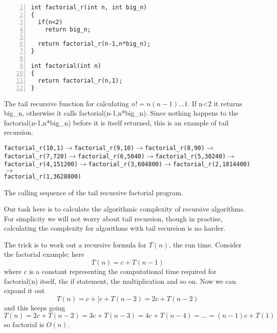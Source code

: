 \documentclass[11pt,a4paper]{scrartcl}
\begin{document}
\begin{table}
\begin{lstlisting}[numbers=left]
int factorial_r(int n, int big_n)
{
  if(n<2)
    return big_n;

  return factorial_r(n-1,n*big_n);
}

int factorial(int n)
{
  return factorial_r(n,1);
}
\end{lstlisting}
\caption{The tail recursive function for calculating $n!=n(n-1)\ldots
  1$. If n<2 it returns big\_n, otherwise it calls
  factorial(n-1,n*big\_n). Since nothing happens to the
  factorial(n-1,n*big\_n) before it is itself returned, this is an
  example of tail recursion.\label{c_factorial_tail}}
\end{table}

\begin{table}
\texttt{factorial\_r(10,1)}$\rightarrow$\texttt{factorial\_r(9,10)}$\rightarrow$\texttt{factorial\_r(8,90)}$\rightarrow$\\
\texttt{factorial\_r(7,720)}$\rightarrow$\texttt{factorial\_r(6,5040)}$\rightarrow$\texttt{factorial\_r(5,30240)}$\rightarrow$\\
\texttt{factorial\_r(4,151200)}$\rightarrow$\texttt{factorial\_r(3,604800)}$\rightarrow$\texttt{factorial\_r(2,1814400)}$\rightarrow$\\
\texttt{factorial\_r(1,3628800)}
\caption{The calling sequence of the tail recursive factorial program.\label{calling}}
\end{table}

Our task here is to calculate the algorithmic complexity of recursive
algorithms. For simplicity we will not worry about tail recursion,
though in practise, calculating the complexity for algorithms with
tail recursion is no harder.

The trick is to work out a recursive formula for $T(n)$, the run
time. Consider the factorial example; here
\begin{equation}
T(n)=c+T(n-1)
\end{equation}
where $c$ is a constant representing the computational time required
for factorial(n) itself, the if statement, the multiplication and so
on. Now we can expand it out
\begin{equation}
T(n)=c+[c+T(n-2)=2c+T(n-2)
\end{equation}
and this keeps going
\begin{equation}
T(n)=2c+T(n-2)=3c+T(n-3)=4c+T(n-4)=\ldots = (n-1)c+T(1)
\end{equation}
so factorial is $O(n)$. 
\end{document}
